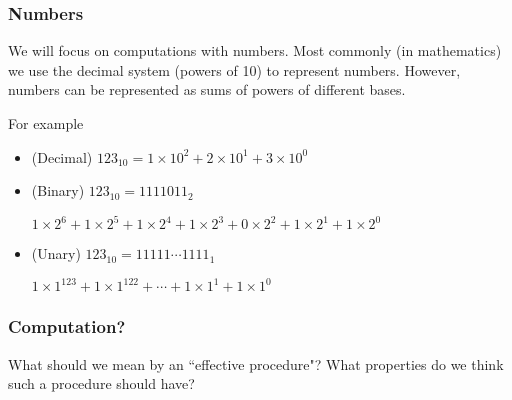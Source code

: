 \documentclass{beamer}
\begin{document}
\begin{frame}
	\frametitle{Numbers}

	We will focus on computations with numbers. Most commonly (in mathematics) we use the decimal system (powers of 10) to represent numbers. However, numbers can be represented as sums of powers of different bases. 

	\vspace{0.5cm}

	For example 

	\vspace{0.1cm}

	\begin{itemize}

		\item (Decimal) $123_{10} = 1\times 10^{2} + 2\times 10^{1} + 3\times 10^{0}$ \vspace{0.5cm}

		\item (Binary) $123_{10} = 1111011_{2}$
		
		$1\times 2^{6} + 1\times 2^{5} + 1\times 2^{4} + 1\times 2^{3} + 0\times 2^{2} + 1\times 2^{1} + 1\times 2^{0}$ \vspace{0.5cm}

		\item (Unary) $123_{10} = 11111 \cdots 1111_{1}$
		
		$1\times 1^{123} + 1\times 1^{122} + \cdots + 1\times 1^{1} + 1\times 1^{0}$
	\end{itemize}

\end{frame}

\begin{frame}
	\frametitle{Computation?}

	What should we mean by an ``effective procedure"? What properties do we think such a procedure should have? 

	\vspace{6cm}

\end{frame}
\end{document}
